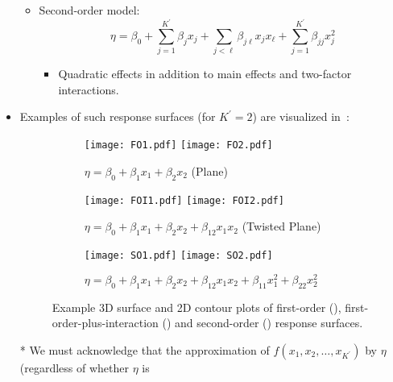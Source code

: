 \begin{itemize}
\begin{itemize}
\begin{itemize}[$\hookrightarrow$]
                    \end{itemize}
              \item Second-order model:
                    \[ \eta=\beta_0+\sum_{j=1}^{K^\prime}\beta_j x_j+\sum_{j<\ell}\beta_{j\ell}x_j x_\ell+\sum_{j=1}^{K^\prime}\beta_{jj}x_j^2  \]
                    \begin{itemize}[$\hookrightarrow$]
                        \item Quadratic effects in addition to main effects and two-factor interactions.
                    \end{itemize}
          \end{itemize}
    \item Examples of such response surfaces (for $ K^\prime=2 $) are visualized in~:
          \begin{figure}[!htbp]
              \centering
              \begin{subfigure}{0.5\textwidth}
                  \centering
                  \texttt{[image: FO1.pdf]}
                  \texttt{[image: FO2.pdf]}
                  \caption{$\eta=\beta_0+\beta_1x_1+\beta_2x_2$ (Plane)}\label{fig:plane}
              \end{subfigure}
              \begin{subfigure}{0.5\textwidth}
                  \centering
                  \texttt{[image: FOI1.pdf]}
                  \texttt{[image: FOI2.pdf]}
                  \caption{$\eta=\beta_0+\beta_1x_1+\beta_2x_2+\beta_{12}x_1x_2$ (Twisted Plane)}\label{fig:twplane}
              \end{subfigure}
              \begin{subfigure}{0.5\textwidth}
                  \centering
                  \texttt{[image: SO1.pdf]}
                  \texttt{[image: SO2.pdf]}
                  \caption{$\eta=\beta_0+\beta_1x_1+\beta_2x_2+\beta_{12}x_1x_2+\beta_{11}x_1^2+\beta_{22}x_2^2$}\label{fig:secondorder}
              \end{subfigure}
              \caption{Example 3D surface and 2D contour plots of first-order (), first-order-plus-interaction ()
                  and second-order () response surfaces.}\label{fig:respsurfaces}
          \end{figure}
    \item[*] We must acknowledge that the approximation of $ f(x_1,x_2,\ldots,x_{K^\prime}) $ by $ \eta $ (regardless of whether $ \eta $ is

\end{itemize}
